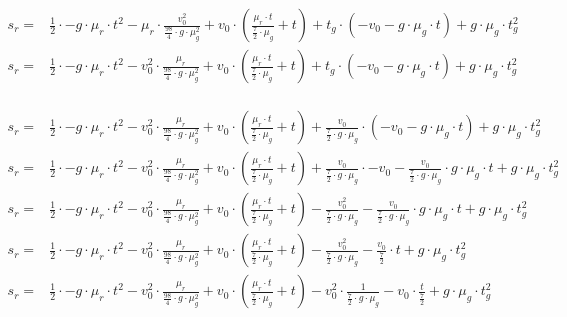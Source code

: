 \begin{equation}
\begin{aligned}
s_r = & \frac{1}{2} \cdot -g \cdot \mu_r \cdot t^2 - \mu_r \cdot \frac{v_0^2}{\frac{98}{4} \cdot g \cdot \mu_g^2} + v_0 \cdot (\frac{\mu_r \cdot t}{\frac{7}{2} \cdot \mu_g} + t) + t_g \cdot (-v_0 - g \cdot \mu_g \cdot t) + g \cdot \mu_g \cdot t_g^2\\
s_r = & \frac{1}{2} \cdot -g \cdot \mu_r \cdot t^2 - v_0^2 \cdot \frac{\mu_r}{\frac{98}{4} \cdot g \cdot \mu_g^2} + v_0 \cdot (\frac{\mu_r \cdot t}{\frac{7}{2} \cdot \mu_g} + t) + t_g \cdot (-v_0 - g \cdot \mu_g \cdot t) + g \cdot \mu_g \cdot t_g^2\\
\end{aligned}
\end{equation}

\begin{equation}
\begin{aligned}
    s_r = & \frac{1}{2} \cdot -g \cdot \mu_r \cdot t^2 - v_0^2 \cdot \frac{\mu_r}{\frac{98}{4} \cdot g \cdot \mu_g^2} + v_0 \cdot (\frac{\mu_r \cdot t}{\frac{7}{2} \cdot \mu_g} + t) + \frac{v_0}{\frac{7}{2} \cdot g \cdot \mu_g} \cdot (-v_0 - g \cdot \mu_g \cdot t) + g \cdot \mu_g \cdot t_g^2\\
    s_r = & \frac{1}{2} \cdot -g \cdot \mu_r \cdot t^2 - v_0^2 \cdot \frac{\mu_r}{\frac{98}{4} \cdot g \cdot \mu_g^2} + v_0 \cdot (\frac{\mu_r \cdot t}{\frac{7}{2} \cdot \mu_g} + t) + \frac{v_0}{\frac{7}{2} \cdot g \cdot \mu_g} \cdot -v_0 - \frac{v_0}{\frac{7}{2} \cdot g \cdot \mu_g} \cdot g \cdot \mu_g \cdot t + g \cdot \mu_g \cdot t_g^2\\
    s_r = & \frac{1}{2} \cdot -g \cdot \mu_r \cdot t^2 - v_0^2 \cdot \frac{\mu_r}{\frac{98}{4} \cdot g \cdot \mu_g^2} + v_0 \cdot (\frac{\mu_r \cdot t}{\frac{7}{2} \cdot \mu_g} + t) - \frac{v_0^2}{\frac{7}{2} \cdot g \cdot \mu_g} - \frac{v_0}{\frac{7}{2} \cdot g \cdot \mu_g} \cdot g \cdot \mu_g \cdot t + g \cdot \mu_g \cdot t_g^2\\
    s_r = & \frac{1}{2} \cdot -g \cdot \mu_r \cdot t^2 - v_0^2 \cdot \frac{\mu_r}{\frac{98}{4} \cdot g \cdot \mu_g^2} + v_0 \cdot (\frac{\mu_r \cdot t}{\frac{7}{2} \cdot \mu_g} + t) - \frac{v_0^2}{\frac{7}{2} \cdot g \cdot \mu_g} - \frac{v_0}{\frac{7}{2}} \cdot t + g \cdot \mu_g \cdot t_g^2\\
    s_r = & \frac{1}{2} \cdot -g \cdot \mu_r \cdot t^2 - v_0^2 \cdot \frac{\mu_r}{\frac{98}{4} \cdot g \cdot \mu_g^2} + v_0 \cdot (\frac{\mu_r \cdot t}{\frac{7}{2} \cdot \mu_g} + t) - v_0^2 \cdot \frac{1}{\frac{7}{2} \cdot g \cdot \mu_g} - v_0 \cdot \frac{t}{\frac{7}{2}} + g \cdot \mu_g \cdot t_g^2\\

\end{aligned}
\end{equation}

